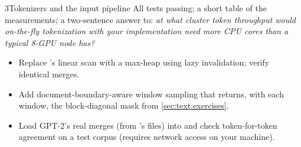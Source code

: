 \begin{labbox}{3}{Tokenizers and the input pipeline}
All tests passing; a short table of the measurements; a two-sentence answer to: \emph{at what
cluster token throughput would on-the-fly tokenization with your implementation need more CPU cores
than a typical 8-GPU node has?}

\begin{itemize}
  \item Replace 's linear scan with a max-heap using lazy invalidation; verify
  identical merges.
  \item Add document-boundary-aware window sampling that returns, with each window, the
  block-diagonal mask from \cref{sec:text:exercises}.
  \item Load GPT-2's real merges (from 's files) into  and check
  token-for-token agreement on a test corpus (requires network access on your machine).
\end{itemize}
\end{labbox}
